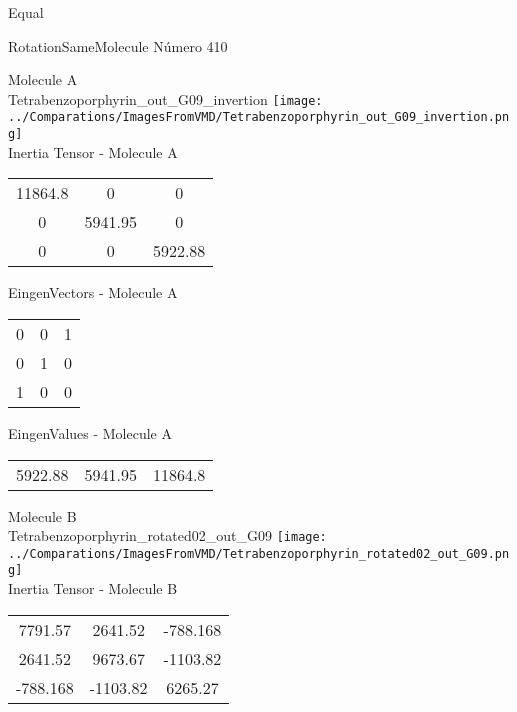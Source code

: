 \begin{center}
\vtab
\vtab
\textcolor{NavyBlue}{\Large Equal}
\end{center}

 \newpage

\vtab[-2cm]
\begin{center}
{\large RotationSameMolecule \tab Número 410}
\end{center}
\begin{multicols}{2}
\begin{center}

Molecule A \\ 
Tetrabenzoporphyrin\_out\_G09\_invertion
\texttt{[image: ../Comparations/ImagesFromVMD/Tetrabenzoporphyrin\_out\_G09\_invertion.png]}
\\
Inertia Tensor - Molecule A \\
\vtab

\begin{tabular}{|c c c|}
11864.8	 & 	0	 & 	0	 \\
0	 & 	5941.95	 & 	0	 \\
0	 & 	0	 & 	5922.88
\end{tabular}

\vtab
 EingenVectors - Molecule A     \\
\vtab
\begin{tabular}{|c c c|}
0	 & 	0	 & 	1	 \\
0	 & 	1	 & 	0	 \\
1	 & 	0	 & 	0
\end{tabular}

\vtab
 EingenValues - Molecule A     \\
\vtab
\begin{tabular}{|c c c|}
5922.88	 & 	5941.95	 & 	11864.8	 \\
\end{tabular}
\columnbreak

Molecule B \\ 
Tetrabenzoporphyrin\_rotated02\_out\_G09
\texttt{[image: ../Comparations/ImagesFromVMD/Tetrabenzoporphyrin\_rotated02\_out\_G09.png]}
\\
Inertia Tensor - Molecule B \\
\vtab

\begin{tabular}{|c c c|}
7791.57	 & 	2641.52	 & 	-788.168	 \\
2641.52	 & 	9673.67	 & 	-1103.82	 \\
-788.168	 & 	-1103.82	 & 	6265.27
\end{tabular}


\end{center}
\end{multicols}
